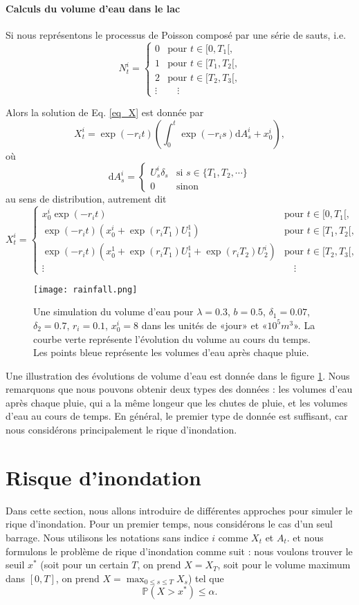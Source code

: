 \documentclass{article}
\def \dd {\mathrm{d}}
\begin{document}
\paragraph{Calculs du volume d'eau dans le lac} Si nous représentons le processus de Poisson composé par une série de sauts, i.e.
\[N_t^i = \begin{cases}0&\textrm{pour $t\in [0, T_1[$,}\\
  1&\textrm{pour $t\in [T_1, T_2[$,}\\
  2&\textrm{pour $t\in [T_2, T_3[$,}\\
  \vdots &\quad\vdots\end{cases}\]

Alors la solution de Eq. \ref{eq_X} est donnée par
\[X_t^i = \exp(-r_i t)\left(\int_0^t \exp(-r_i s)\dd A_s^i + x_0^i\right),\]
où \[\dd A_s^i=\begin{cases} U_s^i\delta_s &\text{si } s\in \{T_1,T_2,\cdots\}\\
  0&\text{sinon}\end{cases}\] 
au sens de distribution, autrement dit
\[X_t^i = \begin{cases}x_0^i\exp(-r_i t)&\textrm{pour $t\in [0, T_1[$,}\\
  \exp(-r_i t)(x_0^i+\exp(r_i T_1)U_1^1)&\textrm{pour $t\in [T_1, T_2[$,}\\
  \exp(-r_i t)(x_0^1+\exp(r_i T_1)U_1^1+\exp(r_i T_2)U_2^i)&\textrm{pour $t\in [T_2, T_3[$,}\\
  \vdots &\quad\vdots\end{cases}\]

\begin{figure}[t]
  \centering
  \texttt{[image: rainfall.png]}
  \caption{Une simulation du volume d'eau pour $\lambda=0.3$, $b=0.5$, $\delta_1=0.07$, $\delta_2=0.7$, $r_i=0.1$, $x_0^i=8$ dans les unités de «jour» et «$10^5m^3$». La courbe verte représente l'évolution du volume au cours du temps. Les points bleue représente les volumes d'eau après chaque pluie.}
  \label{v_e}
\end{figure}

Une illustration des évolutions de volume d'eau est donnée dans le figure \ref{v_e}. Nous remarquons que nous pouvons obtenir deux types des données : les volumes d'eau après chaque pluie, qui a la même longeur que les chutes de pluie, et les volumes d'eau au cours de temps. En général, le premier type de donnée est suffisant, car nous considérons principalement le rique d'inondation.

\section{Risque d'inondation}
Dans cette section, nous allons introduire de différentes approches pour simuler le rique d'inondation. Pour un premier temps, nous considérons le cas d'un seul barrage. Nous utilisons les notations sans indice $i$ comme $X_t$ et $A_t$. et nous formulons le problème de rique d'inondation comme suit : nous voulons trouver le seuil $x^\ast$ (soit pour un certain $T$, on prend $X=X_T$, soit pour le volume maximum dans $[0,T]$, on prend $X=\max_{0\le s\le T}X_s$) tel que
\[\mathbb{P}(X>x^\ast)\leq \alpha.\]
\end{document}
